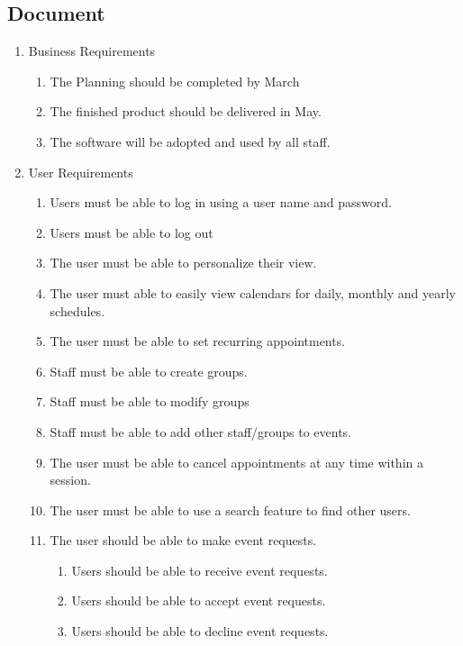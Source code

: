 \documentclass[a4paper]{article}
\begin{document}
\subsection{Document} %
\begin{enumerate}
  \item Business Requirements
  \begin{enumerate}[label=B\arabic*.]
    \item The Planning should be completed by March 
    \item The finished product should be delivered in May.
    \item The software will be adopted and used by all staff.
  \end{enumerate}

  \item User Requirements
  \begin{enumerate}[label=U\arabic*.] 
    \item Users must be able to log in using a user name and password.
    \item Users must be able to log out
    \item The user must be able to personalize their view.
    \item The user must able to easily view calendars for daily, monthly and yearly schedules.
    \item The user must be able to set recurring appointments.
    \item Staff must be able to create groups.
    \item Staff must be able to modify groups
    \item Staff must be able to add other staff/groups to events.
    \item The user must be able to cancel appointments at any time within a session.
    \item The user must be able to use a search feature to find other users.
    \item The user should be able to make event requests. 
    \begin{enumerate}[label*=\arabic*.]
      \item Users should be able to receive event requests.
      \item Users should be able to accept event requests.
      \item Users should be able to decline event requests.
    \end{enumerate}
  \end{enumerate}


\end{enumerate}
\end{document}
